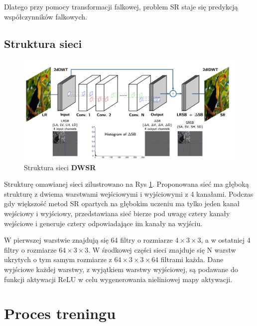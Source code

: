 Dlatego przy pomocy transformacji falkowej, problem SR staje się predykcją współczynników falkowych.


\newpage
\subsection*{Struktura sieci}

\begin{figure}[ht]
    \centering
    \begin{minipage}[t]{0.9\linewidth}
        \includegraphics[width=\linewidth]{Rozdziały/03.DWSR/Obrazy/strultura_DWSR.png}  
        \caption{Struktura sieci \textbf{DWSR}}
        \label{fig:image49}
    \end{minipage}
\end{figure}

Strukturę omawianej sieci \cite{guo2017deep} zilustrowano na Rys \ref{fig:image49}. Proponowana sieć ma głęboką strukturę z dwiema warstwami wejściowymi i wyjściowymi z 4 kanałami. Podczas gdy większość metod SR opartych na głębokim uczeniu ma tylko jeden kanał wejściowy i wyjściowy, przedstawiana sieć bierze pod uwagę cztery kanały wejściowe i generuje cztery odpowiadające im kanały na wyjściu. 

W pierwszej warstwie znajdują się 64 filtry o rozmiarze $4 \times  3 \times 3$, a w ostatniej 4 filtry o rozmiarze $64 \times  3 \times 3$. W środkowej części sieci znajduje się N warstw ukrytych o tym samym rozmiarze z $64 \times  3 \times 3 \times 64$ filtrami każda. Dane wyjściowe każdej warstwy, z wyjątkiem warstwy wyjściowej, są podawane do funkcji aktywacji ReLU w celu wygenerowania nieliniowej mapy aktywacji.


\section{Proces treningu}

